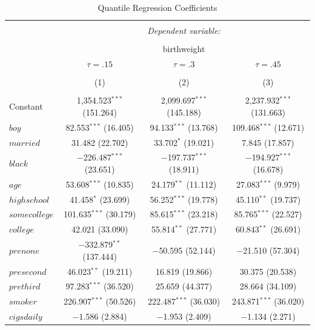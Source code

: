 \documentclass[12pt]{paper}
\begin{document}
\begin{table}[H] \centering 
  \caption{Quantile Regression Coefficients} 
  \label{} 
\small 
\begin{tabular}{@{\extracolsep{1pt}}lccc} 
\\[-1.8ex]\hline 
\hline \\[-1.8ex] 
 & \multicolumn{3}{c}{\textit{Dependent variable:}} \\ 
\cline{2-4} 
\\[-1.8ex] & \multicolumn{3}{c}{birthweight} \\ 
 & $\tau = .15$ & $\tau = .3$ & $\tau = .45$ \\ 
\\[-1.8ex] & (1) & (2) & (3)\\ 
\hline \\[-1.8ex] 
 Constant & 1,354.523$^{***}$ (151.264) & 2,099.697$^{***}$ (145.188) & 2,237.932$^{***}$ (131.663) \\ 
  $boy$ & 82.553$^{***}$ (16.405) & 94.133$^{***}$ (13.768) & 109.468$^{***}$ (12.671) \\ 
  $married$ & 31.482 (22.702) & 33.702$^{*}$ (19.021) & 7.845 (17.857) \\ 
  $black$ & $-$226.487$^{***}$ (23.651) & $-$197.737$^{***}$ (18.911) & $-$194.927$^{***}$ (16.678) \\ 
  $age$ & 53.608$^{***}$ (10.835) & 24.179$^{**}$ (11.112) & 27.083$^{***}$ (9.979) \\ 
  $highschool$ & 41.458$^{*}$ (23.699) & 56.252$^{***}$ (19.778) & 45.110$^{**}$ (19.737) \\ 
  $somecollege$ & 101.635$^{***}$ (30.179) & 85.615$^{***}$ (23.218) & 85.765$^{***}$ (22.527) \\ 
  $college$ & 42.021 (33.090) & 55.814$^{**}$ (27.771) & 60.843$^{**}$ (26.691) \\ 
  $prenone$ & $-$332.879$^{**}$ (137.444) & $-$50.595 (52.144) & $-$21.510 (57.304) \\ 
  $presecond$ & 46.023$^{**}$ (19.211) & 16.819 (19.866) & 30.375 (20.538) \\ 
  $prethird$ & 97.283$^{***}$ (36.520) & 25.659 (44.377) & 28.664 (34.109) \\ 
  $smoker$ & 226.907$^{***}$ (50.526) & 222.487$^{***}$ (36.030) & 243.871$^{***}$ (36.020) \\ 
  $cigsdaily$ & $-$1.586 (2.884) & $-$1.953 (2.409) & $-$1.134 (2.271) \\ 

\end{tabular}
\end{table}
\end{document}
